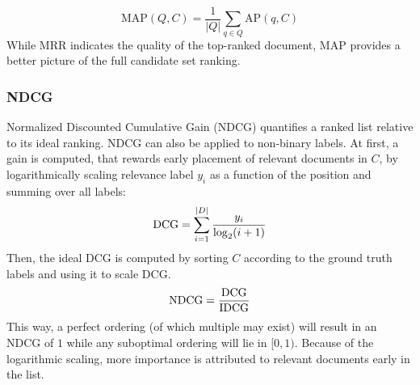 \begin{equation}
    \text{MAP}(Q, C) = \frac{1}{|Q|} \sum_{q \in Q} \text{AP}(q, C)
\end{equation}
While MRR indicates the quality of the top-ranked document, MAP provides a better picture of the full candidate set ranking.

\subsubsection{NDCG}
Normalized Discounted Cumulative Gain (NDCG) quantifies a ranked list relative to its ideal ranking. NDCG can also be applied to non-binary labels. At first, a gain is computed, that rewards early placement of relevant documents in $C$, by logarithmically scaling relevance label $y_i$ as a function of the position and summing over all labels:
\begin{equation}
    \text{DCG} = \sum_{i=1}^{|D|} \frac{y_i}{\log_2(i+1)}
\end{equation}
Then, the ideal DCG is computed by sorting $C$ according to the ground truth labels and using it to scale DCG.
\begin{equation}
    \text{NDCG} = \frac{\text{DCG}}{\text{IDCG}}
\end{equation}
This way, a perfect ordering (of which multiple may exist) will result in an NDCG of $1$ while any suboptimal ordering will lie in $[0, 1)$. Because of the logarithmic scaling, more importance is attributed to relevant documents early in the list.

